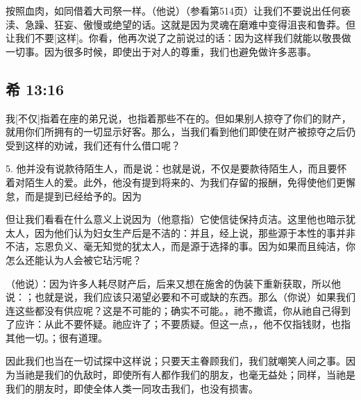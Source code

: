 按照血肉，如同借着大司祭一样。（他说）（参看第514页）让我们不要说出任何亵渎、急躁、狂妄、傲慢或绝望的话。这就是因为灵魂在磨难中变得沮丧和鲁莽。但让我们不要[这样]。你看，他再次说了之前说过的话：因为这样我们就能以敬畏做一切事。因为很多时候，即使出于对人的尊重，我们也避免做许多恶事。\par


\subsection{希 13:16}

我[不仅]指着在座的弟兄说，也指着那些不在的。但如果别人掠夺了你们的财产，就用你们所拥有的一切显示好客。那么，当我们看到他们即使在财产被掠夺之后仍受到这样的劝诫，我们还有什么借口呢？\par

5. 他并没有说款待陌生人，而是说：也就是说，不仅是要款待陌生人，而且要怀着对陌生人的爱。此外，他没有提到将来的、为我们存留的报酬，免得使他们更懈怠，而是提到已经给予的。因为\par

但让我们看看在什么意义上说因为（他意指）它使信徒保持贞洁。这里他也暗示犹太人，因为他们认为妇女生产后是不洁的：并且，经上说，那些源于本性的事并非不洁，忘恩负义、毫无知觉的犹太人，而是源于选择的事。因为如果而且纯洁，你怎么还能认为人会被它玷污呢？\par

（他说）：因为许多人耗尽财产后，后来又想在施舍的伪装下重新获取，所以他说：；也就是说，我们应该只渴望必要和不可或缺的东西。那么（你说）如果我们连这些都没有供应呢？这是不可能的；确实不可能。，祂不撒谎，你从祂自己得到了应许：从此不要怀疑。祂应许了；不要质疑。但这一点，，他不仅指钱财，也指其他一切。；很有道理。\par

因此我们也当在一切试探中这样说；只要天主眷顾我们，我们就嘲笑人间之事。因为当祂是我们的仇敌时，即使所有人都作我们的朋友，也毫无益处；同样，当祂是我们的朋友时，即使全体人类一同攻击我们，也没有损害。\par

